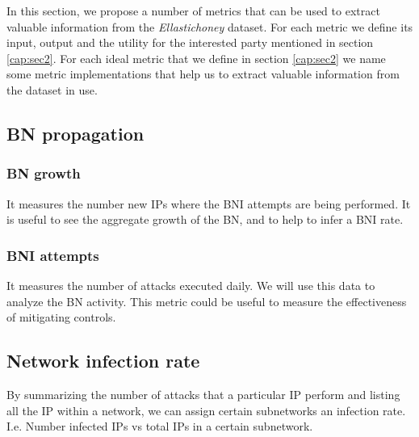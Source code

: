 \label{cap:sec4}


In this section, we propose a number of metrics that can be used to extract valuable information from the \textit{Ellastichoney} dataset. For each metric we define its input, output and the utility for the interested party mentioned in section \ref{cap:sec2}. For each ideal metric that we define in section \ref{cap:sec2} we name some metric implementations that help us to extract valuable information from the dataset in use.
\indent
\subsection{BN propagation}

    \subsubsection{BN growth}It measures the number new IPs where the BNI attempts are being performed. It is useful to see the aggregate growth of the BN, and to help to infer a BNI rate.

    \subsubsection{BNI attempts}
    It measures the number of attacks executed daily. We will use this data to analyze the BN activity. This metric could be useful to measure the effectiveness of mitigating controls.

\subsection{Network infection rate}
By summarizing the number of attacks that a particular IP perform and listing all the IP within a network, we can assign certain subnetworks an infection rate. I.e. Number infected IPs vs total IPs in a certain subnetwork.



